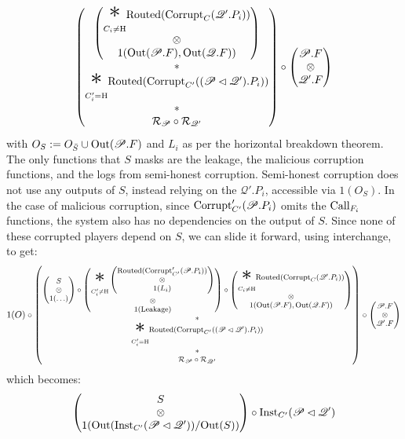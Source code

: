 \begin{theorem}
$$\begin{pmatrix}
\begin{pmatrix}
    {\displaystyle \bigast_{C_i \neq \tx{H}}}
    \tx{Routed}(\tx{Corrupt}_C(\mathscr{Q}'.P_i))
    \cr
    \otimes\cr
    1(\tx{Out}(\mathscr{P}.F), \tx{Out}(\mathscr{Q}.F))
    \end{pmatrix}
    \cr
    *\cr
    {\displaystyle \bigast_{C'_i = \tx{H}}}
    \tx{Routed}(\tx{Corrupt}_{C'}((\mathscr{P} \lhd \mathscr{Q}').P_i))\cr
    *\cr
    \mathcal{R}_{\mathscr{P}} \circ \mathcal{R}_{\mathscr{Q}'}\cr
  \end{pmatrix}
  \circ
  \begin{pmatrix}
    \mathscr{P}.F\cr
    \otimes\cr
    \mathscr{Q}'.F
  \end{pmatrix}
  $$
  with $O_S := O_{\bar{S}} \cup \text{Out}(\mathscr{P}.F)$ and $L_i$ as per the horizontal breakdown theorem.
  The only functions that $S$ masks are the leakage, the malicious corruption
  functions, and the logs from semi-honest corruption.
  Semi-honest corruption does not use any outputs of $S$,
  instead relying on the $\mathscr{Q}'.P_i$, accessible via $1(O_S)$.
  In the case of malicious corruption, since $\text{Corrupt}'_{C'}(\mathscr{P}.P_i)$
  omits the $\text{Call}_{F_i}$ functions, the system also has no dependencies
  on the output of $S$.
  Since none of these corrupted players depend on $S$,
  we can slide it forward, using interchange, to get:
  $$
  \footnotesize
  1(O) \circ
  \begin{pmatrix}
    \begin{pmatrix}
      S\cr
      \otimes\cr
      1(\ldots)
    \end{pmatrix}
    \circ
    \begin{pmatrix}
    {\displaystyle \bigast_{C'_i \neq \tx{H}}}
    \begin{pmatrix}
      \tx{Routed}(\tx{Corrupt}'_{C'}(\mathscr{P}.P_i))\cr
      \otimes\cr
      1(L_i)
    \end{pmatrix}\cr
    \otimes\cr
    1(\tx{Leakage})
    \end{pmatrix}
    \circ
    \begin{pmatrix}
    {\displaystyle \bigast_{C_i \neq \tx{H}}}
    \tx{Routed}(\tx{Corrupt}_C(\mathscr{Q}'.P_i))
    \cr
    \otimes\cr
    1(\tx{Out}(\mathscr{P}.F), \tx{Out}(\mathscr{Q}.F))
    \end{pmatrix}
    \cr
    *\cr
    {\displaystyle \bigast_{C'_i = \tx{H}}}
    \tx{Routed}(\tx{Corrupt}_{C'}((\mathscr{P} \lhd \mathscr{Q}').P_i))\cr
    *\cr
    \mathcal{R}_{\mathscr{P}} \circ \mathcal{R}_{\mathscr{Q}'}\cr
  \end{pmatrix}
  \circ
  \begin{pmatrix}
    \mathscr{P}.F\cr
    \otimes\cr
    \mathscr{Q}'.F
  \end{pmatrix}
  $$
  which becomes:
  $$
  \begin{pmatrix}
    S\cr
    \otimes\cr
    1(\text{Out}(\text{Inst}_{C'}(\mathscr{P} \lhd \mathscr{Q}')) / \text{Out}(S))
  \end{pmatrix}
  \circ
  \text{Inst}_{C'}(\mathscr{P} \lhd \mathscr{Q}')
  $$


\end{theorem}
